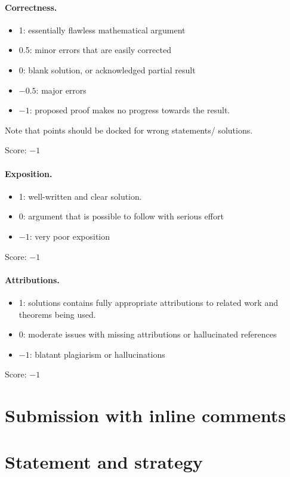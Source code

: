 \documentclass[11pt]{article}
\begin{document}
\paragraph{Correctness.}
\begin{itemize}
	\item  1: essentially flawless mathematical argument
	\item  0.5: minor errors that are easily corrected
	\item  0: blank solution, or acknowledged partial result
	\item  $-0.5$: major errors
	\item  $-1$: proposed proof makes no progress towards the result.
\end{itemize}
Note that points should be docked for wrong statements/ solutions.

\noindent Score: $-1$

\paragraph{Exposition.}
\begin{itemize}
	\item  1: well-written and clear solution.
	\item  0: argument that is possible to follow with serious effort
	\item  $-1$: very poor exposition
\end{itemize}

\noindent Score: $-1$

\paragraph{Attributions.}
\begin{itemize}
	\item  1: solutions contains fully appropriate attributions
		to related work and theorems being used.
	\item  0: moderate issues with missing attributions or hallucinated references
	\item  $-1$: blatant plagiarism or hallucinations
\end{itemize}

\noindent Score: $-1$

\newpage
\section{Submission with inline comments}


\section{Statement and strategy}
\end{document}
